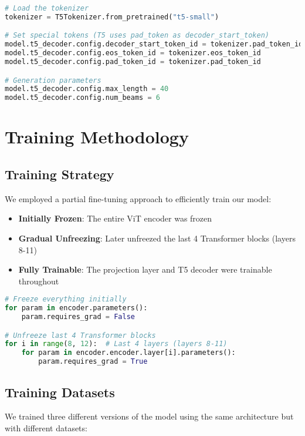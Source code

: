 \documentclass[12pt,a4paper]{report}
\begin{document}
\begin{lstlisting}[language=python, caption=Tokenizer and Generation Configuration]
# Load the tokenizer
tokenizer = T5Tokenizer.from_pretrained("t5-small")

# Set special tokens (T5 uses pad_token as decoder_start_token)
model.t5_decoder.config.decoder_start_token_id = tokenizer.pad_token_id
model.t5_decoder.config.eos_token_id = tokenizer.eos_token_id
model.t5_decoder.config.pad_token_id = tokenizer.pad_token_id

# Generation parameters
model.t5_decoder.config.max_length = 40
model.t5_decoder.config.num_beams = 6
\end{lstlisting}

\section{Training Methodology}

\subsection{Training Strategy}
We employed a partial fine-tuning approach to efficiently train our model:
\begin{itemize}
    \item \textbf{Initially Frozen}: The entire ViT encoder was frozen
    \item \textbf{Gradual Unfreezing}: Later unfreezed the last 4 Transformer blocks (layers 8-11)
    \item \textbf{Fully Trainable}: The projection layer and T5 decoder were trainable throughout
\end{itemize}

\begin{lstlisting}[language=python, caption=Selective Layer Unfreezing]
# Freeze everything initially
for param in encoder.parameters():
    param.requires_grad = False  

# Unfreeze last 4 Transformer blocks
for i in range(8, 12):  # Last 4 layers (layers 8-11)
    for param in encoder.encoder.layer[i].parameters():
        param.requires_grad = True  
\end{lstlisting}

\subsection{Training Datasets}
We trained three different versions of the model using the same architecture but with different datasets:
\end{document}
